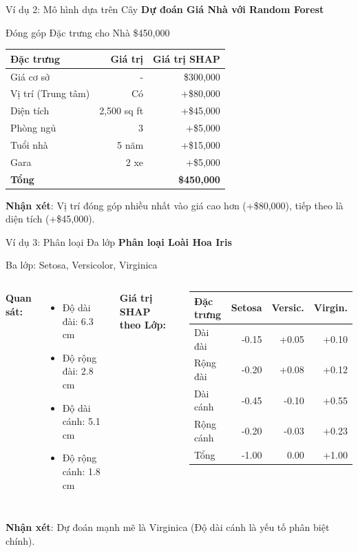 \documentclass[notheorems, aspectratio=149]{beamer}
\begin{document}
\begin{frame}{Ví dụ 2: Mô hình dựa trên Cây}
\textbf{Dự đoán Giá Nhà với Random Forest}

\begin{block}{Đóng góp Đặc trưng cho Nhà \$450,000}
\begin{center}
\begin{tabular}{lrr}
\toprule
Đặc trưng & Giá trị & Giá trị SHAP \\
\midrule
Giá cơ sở & - & \$300,000 \\
Vị trí (Trung tâm) & Có & +\$80,000 \\
Diện tích & 2,500 sq ft & +\$45,000 \\
Phòng ngủ & 3 & +\$5,000 \\
Tuổi nhà & 5 năm & +\$15,000 \\
Gara & 2 xe & +\$5,000 \\
\midrule
\textbf{Tổng} & & \textbf{\$450,000} \\
\bottomrule
\end{tabular}
\end{center}
\end{block}

\textbf{Nhận xét}: Vị trí đóng góp nhiều nhất vào giá cao hơn (+\$80,000), tiếp theo là diện tích (+\$45,000).
\end{frame}

\begin{frame}{Ví dụ 3: Phân loại Đa lớp}
\textbf{Phân loại Loài Hoa Iris}

Ba lớp: Setosa, Versicolor, Virginica

\begin{columns}
\textbf{Quan sát:}
\begin{itemize}
    \item Độ dài đài: 6.3 cm
    \item Độ rộng đài: 2.8 cm
    \item Độ dài cánh: 5.1 cm
    \item Độ rộng cánh: 1.8 cm
\end{itemize}

\textbf{Giá trị SHAP theo Lớp:}

\begin{tabular}{lrrr}
\toprule
Đặc trưng & Setosa & Versic. & Virgin. \\
\midrule
Dài đài & -0.15 & +0.05 & +0.10 \\
Rộng đài & -0.20 & +0.08 & +0.12 \\
Dài cánh & -0.45 & -0.10 & +0.55 \\
Rộng cánh & -0.20 & -0.03 & +0.23 \\
\midrule
Tổng & -1.00 & 0.00 & +1.00 \\
\bottomrule
\end{tabular}
\end{columns}

\vspace{1cm}
\textbf{Nhận xét}: Dự đoán mạnh mẽ là Virginica (Độ dài cánh là yếu tố phân biệt chính).
\end{frame}
\end{document}
